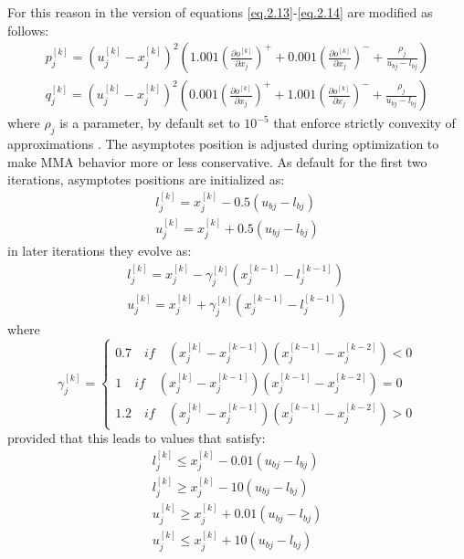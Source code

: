 For this reason in the version of \cite{svanberg2007mma} equations \eqref{eq.2.13}-\eqref{eq.2.14} are modified as follows:
\begin{eqnarray}
p_j^{[k]}=\left(u_j^{[k]}-x_j^{[k]}\right)^2\left(1.001\left(\frac{\partial o^{[k]}}{\partial x_j}\right)^++0.001\left(\frac{\partial o^{[k]}}{\partial x_j}\right)^-+\frac{\rho_j}{u_{bj}-l_{bj}}\right)\\
q_j^{[k]}=\left(u_j^{[k]}-x_j^{[k]}\right)^2\left(0.001\left(\frac{\partial o^{[k]}}{\partial x_j}\right)^++1.001\left(\frac{\partial o^{[k]}}{\partial x_j}\right)^-+\frac{\rho_j}{u_{bj}-l_{bj}}\right)
\end{eqnarray}
where $\rho_j$ is a parameter, by default set to $10^{-5}$ that enforce strictly convexity of approximations \cite{svanberg2007mma}. The asymptotes position is adjusted during optimization to make MMA behavior more or less conservative. 
As default for the first two iterations, asymptotes positions are initialized as:
\begin{eqnarray}
l_j^{[k]}=x_j^{[k]}-0.5\left(u_{bj}-l_{bj}\right)\\
u_j^{[k]}=x_j^{[k]}+0.5\left(u_{bj}-l_{bj}\right)
\end{eqnarray}
in later iterations they evolve as:
\begin{eqnarray}
l_j^{[k]}=x_j^{[k]}-\gamma_j^{[k]}\left(x_j^{[k-1]}-l_j^{[k-1]}\right)\\
u_j^{[k]}=x_j^{[k]}+\gamma_j^{[k]}\left(x_j^{[k-1]}-l_j^{[k-1]}\right)
\end{eqnarray}
where
\begin{equation}
\gamma_j^{[k]}=\begin{cases}
0.7 \quad \textit{if} \quad \left(x_j^{[k]}-x_j^{[k-1]}\right)\left(x_j^{[k-1]}-x_j^{[k-2]}\right)<0\\
1 \quad \textit{if} \quad \left(x_j^{[k]}-x_j^{[k-1]}\right)\left(x_j^{[k-1]}-x_j^{[k-2]}\right)=0\\
1.2 \quad \textit{if} \quad \left(x_j^{[k]}-x_j^{[k-1]}\right)\left(x_j^{[k-1]}-x_j^{[k-2]}\right)>0
\end{cases}
\end{equation}
provided that this leads to values that satisfy:
\begin{eqnarray}
l_j^{[k]}\leq x_j^{[k]}-0.01\left(u_{bj}-l_{bj}\right)\\
\label{eqnMNAl}
l_j^{[k]}\geq x_j^{[k]}-10\left(u_{bj}-l_{bj}\right)\\
u_j^{[k]}\geq x_j^{[k]}+0.01\left(u_{bj}-l_{bj}\right)\\
\label{eqnMNAu}
u_j^{[k]}\leq x_j^{[k]}+10\left(u_{bj}-l_{bj}\right)
\end{eqnarray}
